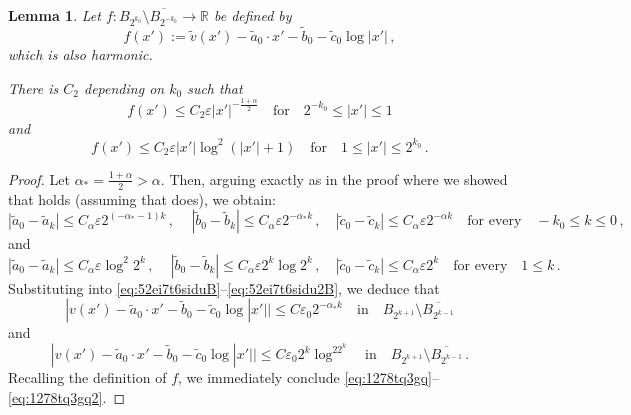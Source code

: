 \documentclass{article}
\newcommand{\R}{\mathbb{R}}
\newcommand{\ep}{\varepsilon}
\newtheorem{lemma}[theorem]{Lemma}
\theoremstyle{definition}
\begin{document}
\begin{lemma}\label{lem:grphregnHypB}
    Let $f:B_{2^{k_0}}\setminus \overline{B_{2^{-k_0}}}\to\R$ be defined by
    \begin{equation}\label{eq:894tibhabHypB}
        f(x'):=\widetilde v (x')-\widetilde a_0\cdot x'-\widetilde b_0-\widetilde c_0\log|x'|\,,
    \end{equation}
    which is also harmonic.

    There is $C_2$ depending on $k_0$ such that
\begin{equation}\label{eq:1278tq3gq}
    f(x')\leq C_2\ep|x'|^{-\frac{1+\alpha}{2}}\quad\mbox{for}\quad 2^{-k_0}\leq|x'|\leq 1
\end{equation}
and
\begin{equation}\label{eq:1278tq3gq2}
    f(x')\leq C_2\ep|x'|\log^2(|x'|+1)\quad\mbox{for}\quad 1\leq|x'|\leq 2^{k_0}\,.
\end{equation}
\end{lemma}
\begin{proof}
Let $\alpha_*=\frac{1+\alpha}{2}>\alpha$. Then, arguing exactly as in the proof where we showed that  holds (assuming that  does), we obtain:
\begin{equation*}
    |\widetilde a_0-\widetilde a_k|\leq C_\alpha\ep 2^{(-\alpha_*-1)k}\,,\quad\,|\widetilde b_0-\widetilde b_k|\leq C_\alpha \ep 2^{-\alpha_* k}\,,\quad |\widetilde c_0-\widetilde c_k|\leq C_\alpha \ep 2^{-\alpha k}\quad\mbox{for every}\quad -k_0\leq k\leq 0\,,
\end{equation*}
and
\begin{equation*}
    |\widetilde a_0-\widetilde a_k|\leq C_\alpha\ep \log^2 2^k\,,\quad\,|\widetilde b_0-\widetilde b_k|\leq C_\alpha \ep 2^{k}\log 2^k\,,\quad |\widetilde c_0-\widetilde c_k|\leq C_\alpha \ep 2^k\quad\mbox{for every}\quad 1\leq k\,.
\end{equation*}
Substituting into \eqref{eq:52ei7t6siduB}--\eqref{eq:52ei7t6sidu2B}, we deduce that
\begin{equation*}
    |v(x')-\widetilde a_0\cdot x'-\widetilde b_0-\widetilde c_0\log |x'||\leq  C\ep_0 2^{-\alpha_* k}\quad\mbox{in}\quad B_{2^{k+1}}\setminus \overline{B_{2^{k-1}}}
\end{equation*}
and
\begin{equation*}
    |v(x')-\widetilde a_0\cdot x'-\widetilde b_0-\widetilde c_0\log |x'||\leq  C\ep_0 2^{ k}\log^22^k\quad\mbox{in}\quad B_{2^{k+1}}\setminus \overline{B_{2^{k-1}}}\,.
\end{equation*}
Recalling the definition of $f$, we immediately conclude \eqref{eq:1278tq3gq}--\eqref{eq:1278tq3gq2}.
\end{proof}
\end{document}
